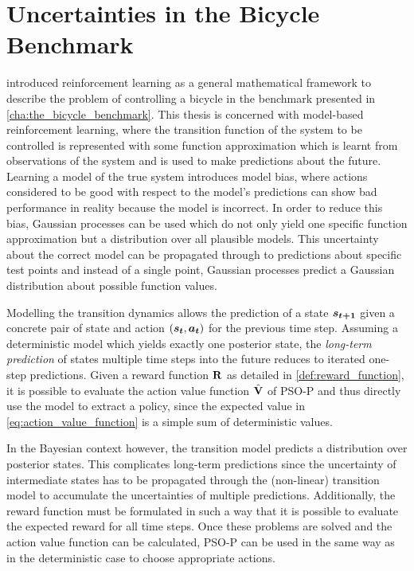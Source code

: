 \chapter{Uncertainties in the Bicycle Benchmark}
\label{cha:solution}
 introduced reinforcement learning as a general mathematical framework to describe the problem of controlling a bicycle in the benchmark presented in \cref{cha:the_bicycle_benchmark}.
This thesis is concerned with model-based reinforcement learning, where the transition function of the system to be controlled is represented with some function approximation which is learnt from observations of the system and is used to make predictions about the future.
Learning a model of the true system introduces model bias, where actions considered to be good with respect to the model's predictions can show bad performance in reality because the model is incorrect.
In order to reduce this bias, Gaussian processes can be used which do not only yield one specific function approximation but a distribution over all plausible models.
This uncertainty about the correct model can be propagated through to predictions about specific test points and instead of a single point, Gaussian processes predict a Gaussian distribution about possible function values.

Modelling the transition dynamics allows the prediction of a state $\bm{s_{t+1}}$ given a concrete pair of state and action $(\bm{s_t}, \bm{a_t})$ for the previous time step.
Assuming a deterministic model which yields exactly one posterior state, the \emph{long-term prediction} of states multiple time steps into the future reduces to iterated one-step predictions.
Given a reward function $\operatorname{\mathbf{R}}$ as detailed in \cref{def:reward_function}, it is possible to evaluate the action value function $\operatorname{\hat{\operatorname{\mathbf{V}}}}$ of PSO-P and thus directly use the model to extract a policy, since the expected value in \cref{eq:action_value_function} is a simple sum of deterministic values.

In the Bayesian context however, the transition model predicts a distribution over posterior states.
This complicates long-term predictions since the uncertainty of intermediate states has to be propagated through the (non-linear) transition model to accumulate the uncertainties of multiple predictions.
Additionally, the reward function must be formulated in such a way that it is possible to evaluate the expected reward for all time steps.
Once these problems are solved and the action value function can be calculated, PSO-P can be used in the same way as in the deterministic case to choose appropriate actions.

